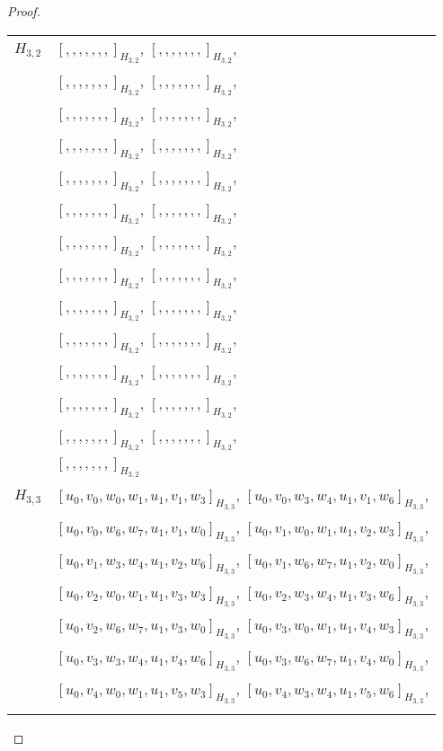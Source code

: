 \begin{subappendices}
\begin{proof}
{ \small
\begin{longtable}{|c|l|}
\hline
$H_{3,2}$ &
  $[, , , , , , ,]_{H_{3,2}}$,
  $[, , , , , , ,]_{H_{3,2}}$, \\* &
  $[, , , , , , ,]_{H_{3,2}}$,
  $[, , , , , , ,]_{H_{3,2}}$, \\* &
  $[, , , , , , ,]_{H_{3,2}}$,
  $[, , , , , , ,]_{H_{3,2}}$, \\* &
  $[, , , , , , ,]_{H_{3,2}}$,
  $[, , , , , , ,]_{H_{3,2}}$, \\* &
  $[, , , , , , ,]_{H_{3,2}}$,
  $[, , , , , , ,]_{H_{3,2}}$, \\* &
  $[, , , , , , ,]_{H_{3,2}}$,
  $[, , , , , , ,]_{H_{3,2}}$, \\* &
  $[, , , , , , ,]_{H_{3,2}}$,
  $[, , , , , , ,]_{H_{3,2}}$, \\* &
  $[, , , , , , ,]_{H_{3,2}}$,
  $[, , , , , , ,]_{H_{3,2}}$, \\* &
  $[, , , , , , ,]_{H_{3,2}}$,
  $[, , , , , , ,]_{H_{3,2}}$, \\* &
  $[, , , , , , ,]_{H_{3,2}}$,
  $[, , , , , , ,]_{H_{3,2}}$, \\* &
  $[, , , , , , ,]_{H_{3,2}}$,
  $[, , , , , , ,]_{H_{3,2}}$, \\* &
  $[, , , , , , ,]_{H_{3,2}}$,
  $[, , , , , , ,]_{H_{3,2}}$, \\* &
  $[, , , , , , ,]_{H_{3,2}}$,
  $[, , , , , , ,]_{H_{3,2}}$, \\* &
  $[, , , , , , ,]_{H_{3,2}}$
\\ \hline
$H_{3,3}$ &
  $[u_0, v_0, w_0, w_1, u_1, v_1, w_3]_{H_{3,3}}$,
  $[u_0, v_0, w_3, w_4, u_1, v_1, w_6]_{H_{3,3}}$, \\* &
  $[u_0, v_0, w_6, w_7, u_1, v_1, w_0]_{H_{3,3}}$,
  $[u_0, v_1, w_0, w_1, u_1, v_2, w_3]_{H_{3,3}}$, \\* &
  $[u_0, v_1, w_3, w_4, u_1, v_2, w_6]_{H_{3,3}}$,
  $[u_0, v_1, w_6, w_7, u_1, v_2, w_0]_{H_{3,3}}$, \\* &
  $[u_0, v_2, w_0, w_1, u_1, v_3, w_3]_{H_{3,3}}$,
  $[u_0, v_2, w_3, w_4, u_1, v_3, w_6]_{H_{3,3}}$, \\* &
  $[u_0, v_2, w_6, w_7, u_1, v_3, w_0]_{H_{3,3}}$,
  $[u_0, v_3, w_0, w_1, u_1, v_4, w_3]_{H_{3,3}}$, \\* &
  $[u_0, v_3, w_3, w_4, u_1, v_4, w_6]_{H_{3,3}}$,
  $[u_0, v_3, w_6, w_7, u_1, v_4, w_0]_{H_{3,3}}$, \\* &
  $[u_0, v_4, w_0, w_1, u_1, v_5, w_3]_{H_{3,3}}$,
  $[u_0, v_4, w_3, w_4, u_1, v_5, w_6]_{H_{3,3}}$, \\* &

\end{longtable}}
\end{proof}
\end{subappendices}
